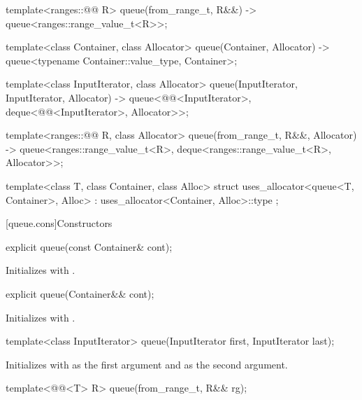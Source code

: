 \begin{codeblock}
{  template<ranges::@@ R>
    queue(from_range_t, R&&) -> queue<ranges::range_value_t<R>>;

  template<class Container, class Allocator>
    queue(Container, Allocator) -> queue<typename Container::value_type, Container>;

  template<class InputIterator, class Allocator>
    queue(InputIterator, InputIterator, Allocator)
      -> queue<@@<InputIterator>, deque<@@<InputIterator>,
               Allocator>>;

  template<ranges::@@ R, class Allocator>
    queue(from_range_t, R&&, Allocator)
      -> queue<ranges::range_value_t<R>, deque<ranges::range_value_t<R>, Allocator>>;

  template<class T, class Container, class Alloc>
    struct uses_allocator<queue<T, Container>, Alloc>
      : uses_allocator<Container, Alloc>::type { };
}
\end{codeblock}

[queue.cons]{Constructors}

%
\begin{itemdecl}
explicit queue(const Container& cont);
\end{itemdecl}

\begin{itemdescr}
\pnum
\effects
Initializes  with .
\end{itemdescr}

%
\begin{itemdecl}
explicit queue(Container&& cont);
\end{itemdecl}

\begin{itemdescr}
\pnum
\effects
Initializes  with .
\end{itemdescr}

%
\begin{itemdecl}
template<class InputIterator>
  queue(InputIterator first, InputIterator last);
\end{itemdecl}

\begin{itemdescr}
\pnum
\effects
Initializes  with
 as the first argument and  as the second argument.
\end{itemdescr}

%
\begin{itemdecl}
template<@@<T> R>
  queue(from_range_t, R&& rg);
\end{itemdecl}

